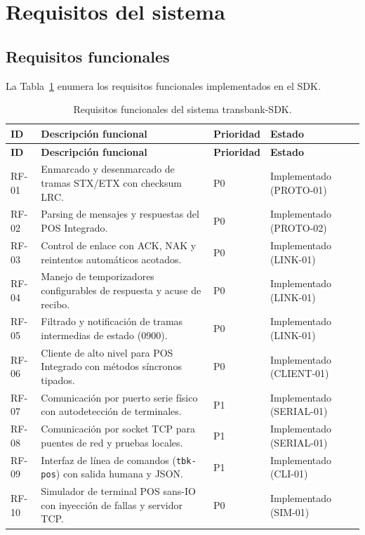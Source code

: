 \documentclass{../../plantilla/raysac-informe}
\begin{document}
\clearpage
\section{Requisitos del sistema}

\subsection{Requisitos funcionales}
La Tabla~\ref{tab:requisitos-funcionales} enumera los requisitos funcionales implementados en el SDK.

\begin{longtable}{@{}p{1.4cm}p{7.2cm}p{2.2cm}p{3.4cm}@{}}
\caption{Requisitos funcionales del sistema transbank-SDK.}\label{tab:requisitos-funcionales}\\
\toprule
\textbf{ID} & \textbf{Descripción funcional} & \textbf{Prioridad} & \textbf{Estado} \\
\midrule
\endfirsthead
\toprule
\textbf{ID} & \textbf{Descripción funcional} & \textbf{Prioridad} & \textbf{Estado} \\
\midrule
\endhead
\bottomrule
\endlastfoot
RF-01 & Enmarcado y desenmarcado de tramas STX/ETX con checksum LRC. & P0 & Implementado (PROTO-01) \\
RF-02 & Parsing de mensajes y respuestas del POS Integrado. & P0 & Implementado (PROTO-02) \\
RF-03 & Control de enlace con ACK, NAK y reintentos automáticos acotados. & P0 & Implementado (LINK-01) \\
RF-04 & Manejo de temporizadores configurables de respuesta y acuse de recibo. & P0 & Implementado (LINK-01) \\
RF-05 & Filtrado y notificación de tramas intermedias de estado (0900). & P0 & Implementado (LINK-01) \\
RF-06 & Cliente de alto nivel para POS Integrado con métodos síncronos tipados. & P0 & Implementado (CLIENT-01) \\
RF-07 & Comunicación por puerto serie físico con autodetección de terminales. & P1 & Implementado (SERIAL-01) \\
RF-08 & Comunicación por socket TCP para puentes de red y pruebas locales. & P1 & Implementado (SERIAL-01) \\
RF-09 & Interfaz de línea de comandos (\texttt{tbk-pos}) con salida humana y JSON. & P1 & Implementado (CLI-01) \\
RF-10 & Simulador de terminal POS sans-IO con inyección de fallas y servidor TCP. & P0 & Implementado (SIM-01) \\

\end{longtable}
\end{document}
